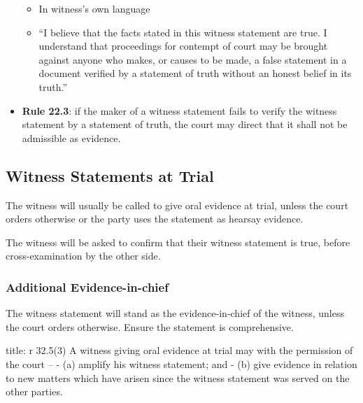 \documentclass[
]{article}
\newenvironment{Shaded}{}{}
\newcommand{\NormalTok}[1]{#1}
\providecommand{\tightlist}{%
  \setlength{\itemsep}{0pt}\setlength{\parskip}{0pt}}
\begin{document}
\begin{itemize}
  \begin{itemize}
  \tightlist
  \item
    In witness's own language
  \item
    ``I believe that the facts stated in this witness statement are
    true. I understand that proceedings for contempt of court may be
    brought against anyone who makes, or causes to be made, a false
    statement in a document verified by a statement of truth without an
    honest belief in its truth.''
  \end{itemize}
\item
  \textbf{Rule 22.3}: if the maker of a witness statement fails to
  verify the witness statement by a statement of truth, the court may
  direct that it shall not be admissible as evidence.
\end{itemize}

\hypertarget{witness-statements-at-trial}{%
\subsection{Witness Statements at
Trial}\label{witness-statements-at-trial}}

The witness will usually be called to give oral evidence at trial,
unless the court orders otherwise or the party uses the statement as
hearsay evidence.

The witness will be asked to confirm that their witness statement is
true, before cross-examination by the other side.

\hypertarget{additional-evidence-in-chief}{%
\subsubsection{Additional
Evidence-in-chief}\label{additional-evidence-in-chief}}

The witness statement will stand as the evidence-in-chief of the
witness, unless the court orders otherwise. Ensure the statement is
comprehensive.

\begin{Shaded}
\begin{Highlighting}[]
\NormalTok{title: r 32.5(3)}
\NormalTok{A witness giving oral evidence at trial may with the permission of the court –}
\NormalTok{{-} (a) amplify his witness statement; and}
\NormalTok{{-} (b) give evidence in relation to new matters which have arisen since the witness statement was served on the other parties.}
\end{Highlighting}
\end{Shaded}
\end{document}
